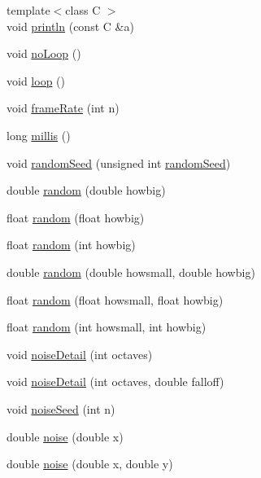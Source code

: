 \begin{DoxyCompactItemize}
{\footnotesize template$<$class C $>$ }\\void \hyperlink{namespacecprocessing_adb24a9653ec0c180336385d1c006a658}{println} (const \-C \&a)
\item 
void \hyperlink{namespacecprocessing_aec8195139a88226bc60d3eddaa5d65b9}{no\-Loop} ()
\item 
void \hyperlink{namespacecprocessing_a66554fc7a3370552f74c563d0c5adcef}{loop} ()
\item 
void \hyperlink{namespacecprocessing_a09d66ead6ff18c18aa353ee6ed50bb78}{frame\-Rate} (int n)
\item 
long \hyperlink{namespacecprocessing_ad302883a6ce30f331258927090bf924a}{millis} ()
\item 
void \hyperlink{namespacecprocessing_a71cb5d974435b9aff63bab3fd9e47b2c}{random\-Seed} (unsigned int \hyperlink{namespacecprocessing_a71cb5d974435b9aff63bab3fd9e47b2c}{random\-Seed})
\item 
double \hyperlink{namespacecprocessing_af80d5416f0be7b44024b66fdab375cf5}{random} (double howbig)
\item 
float \hyperlink{namespacecprocessing_a4254fb2e188dcbfc114392750df85469}{random} (float howbig)
\item 
float \hyperlink{namespacecprocessing_a874dc56fc0d6e65a1b13e40e2c88d367}{random} (int howbig)
\item 
double \hyperlink{namespacecprocessing_acbb34da5bbdcb90c835f747da782164a}{random} (double howsmall, double howbig)
\item 
float \hyperlink{namespacecprocessing_a4acf597a7eba6baff6bb2dfceb44e91b}{random} (float howsmall, float howbig)
\item 
float \hyperlink{namespacecprocessing_aff94df2ca686ab8cb8c29e06f06c41c8}{random} (int howsmall, int howbig)
\item 
void \hyperlink{namespacecprocessing_a4eeb81f5fead851fd3a5fa23286b8b99}{noise\-Detail} (int octaves)
\item 
void \hyperlink{namespacecprocessing_ac2ffd86761a271d29697d6408a125e59}{noise\-Detail} (int octaves, double falloff)
\item 
void \hyperlink{namespacecprocessing_a018a4f19c47283bd51f6c0004bdbaa78}{noise\-Seed} (int n)
\item 
double \hyperlink{namespacecprocessing_a4289b302ccbd6bee448b7756854c7baf}{noise} (double x)
\item 
double \hyperlink{namespacecprocessing_a94c3501dd1ee3555f5af3884b11b8a04}{noise} (double x, double y)
\item 

\end{DoxyCompactItemize}
